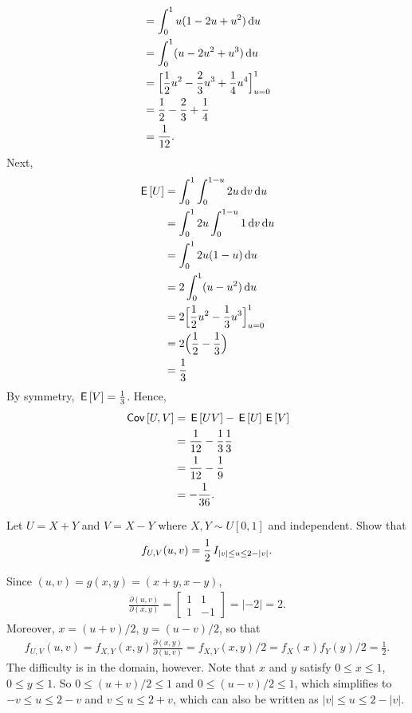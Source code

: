 \begin{exercise}
\begin{solution}
\begin{enumerate}
\begin{align}
        &= \int_0^1 u(1 - 2u + u^2) \,\textrm{d}u \\
        &= \int_0^1 (u - 2u^2 + u^3) \,\textrm{d}u \\
        &= \Big[ \frac{1}{2}u^2 - \frac{2}{3}u^3 + \frac{1}{4}u^4 \Big]_{u=0}^1 \\
        &= \frac{1}{2} - \frac{2}{3} + \frac{1}{4} \\
        &= \frac{1}{12}.
    \end{align}
    Next,
    \begin{align}
        \,\mathsf{E}\left[U\right] &= \int_0^1 \int_0^{1-u} 2 u \,\textrm{d}v \,\textrm{d}u \\
        &= \int_0^1 2 u \int_0^{1-u} 1 \,\textrm{d}v \,\textrm{d}u \\
        &= \int_0^1 2 u(1-u) \,\textrm{d}u \\
        &= 2 \int_0^1 (u - u^2) \,\textrm{d}u \\
        &= 2  \Big[\frac{1}{2}u^2 - \frac{1}{3}u^3\Big]_{u=0}^1 \\
        &= 2 \Big(\frac{1}{2} - \frac{1}{3}\Big) \\
        &= \frac{1}{3}
    \end{align}
    By symmetry, $\,\mathsf{E}\left[V\right] = \frac{1}{3}$. Hence,
    \begin{align}
        \,\mathsf{Cov}\left[U,V\right] &= \,\mathsf{E}\left[UV\right] - \,\mathsf{E}\left[U\right]\,\mathsf{E}\left[V\right] \\
        &= \frac{1}{12} - \frac{1}{3}\frac{1}{3}\\
        &= \frac{1}{12} - \frac{1}{9} \\
        &= -\frac{1}{36}.
    \end{align}
\end{enumerate}
\end{solution}
\end{exercise}




\begin{exercise}
Let $U=X+Y$ and $V=X-Y$ where $X,Y\sim U[0,1]$ and independent. Show that
\begin{align*}
f_{U,V}(u,v) = \frac 12 \,I_{|v| \leq u \leq 2-|v|}.
\end{align*}
\begin{solution}
Since $(u,v) = g(x,y)  = (x+y, x-y)$,
\begin{align*}
\frac{\partial(u,v)}{\partial(x,y)} =
\begin{bmatrix}
1 & 1 \\
1 & -1
\end{bmatrix} = |-2| =2.
\end{align*}
Moreover, $x=(u+v)/2$, $y=(u-v)/2$, so that
\begin{align*}
f_{U,V}(u,v) = f_{X,Y}(x,y) \frac{\partial(x,y)}{\partial(u,v)} = f_{X,Y}(x,y)/2 = f_X(x) f_Y(y)/2 = \frac 1 2.
\end{align*}
The difficulty is in the domain, however. Note that $x$ and $y$ satisfy $0 \leq x \leq 1$, $0 \leq y \leq 1$.
So $0 \leq (u+v)/2 \leq 1$ and $0 \leq (u-v)/2 \leq 1$, which simplifies to $-v \leq u \leq 2-v$ and $v \leq u \leq 2+v$, which can also be written as $|v| \leq u \leq 2-|v|$.
\end{solution}
\end{exercise}


